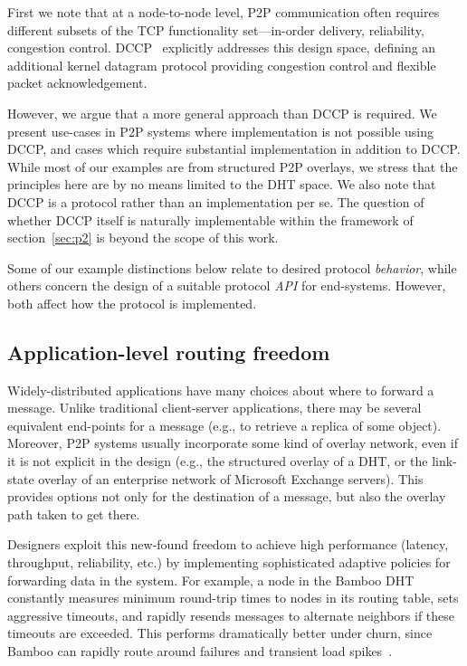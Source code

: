 First we note that at a node-to-node level, P2P
communication often requires different subsets of the TCP
functionality set---in-order delivery, reliability, congestion
control. 
DCCP~\cite{dccp-problem} explicitly addresses this design space,
defining an additional kernel datagram protocol providing
congestion control and flexible packet acknowledgement. 

However, we argue that a more general approach than DCCP
is required.  We present use-cases in P2P systems where
implementation is not possible using DCCP, and cases which
require substantial implementation in addition to DCCP.   While most
of our examples are from structured P2P overlays, we stress that the
principles here are by no means limited to the DHT space. 
We also note that DCCP is a protocol rather than an
implementation per se.  The question of whether DCCP itself is
naturally implementable within the framework of section~\ref{sec:p2}
is beyond the scope of this work.

Some of our example distinctions below relate to desired protocol
\emph{behavior}, while others concern the design of a suitable protocol
\emph{API} for end-systems.  However, both affect how the protocol is implemented.

\subsection{Application-level routing freedom}
\label{sec:routingFreedom}

Widely-distributed applications have many choices about
where to forward a message.  Unlike traditional client-server
applications, there may be several equivalent end-points for a message 
(e.g., to retrieve a replica of some object).  
Moreover, P2P systems usually incorporate some kind of overlay
network, even if it is not explicit in the
design (e.g., the structured overlay of a DHT, or the
link-state overlay of an enterprise network of Microsoft
Exchange servers).  This provides options not only for the
destination of a message, but also the overlay path taken to get
there.

Designers exploit this new-found freedom to achieve high performance
(latency, throughput, reliability, etc.) by implementing
sophisticated adaptive policies for forwarding data in the system.  For
example, a node in the Bamboo DHT~\cite{rhea_usenix_2004} constantly
measures minimum round-trip times to nodes in its routing table, sets
aggressive timeouts, and rapidly resends messages to alternate
neighbors if these timeouts are exceeded.   This performs
dramatically better under churn, since Bamboo can rapidly route 
around failures and transient load spikes~\cite{rhea_usenix_2004}. 


